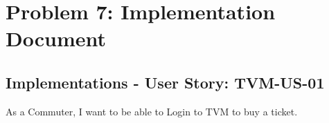 \documentclass[a4paper,12pt]{report}
\begin{document}
\vspace{2cm}
\FloatBarrier
\section{Problem 7: Implementation Document}


\vspace{1cm}
\FloatBarrier
\subsection{Implementations - User Story: TVM-US-01}
As a Commuter, I want to be able to Login to TVM to buy a ticket.
\end{document}
